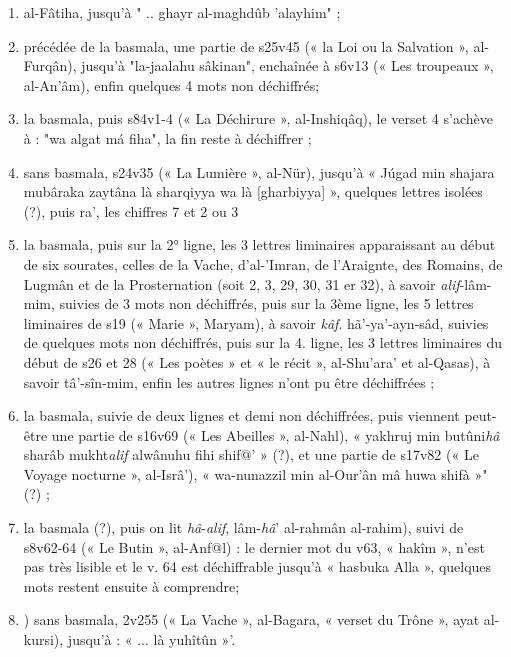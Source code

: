 \begin{enumerate}
   \item al-Fâtiha, jusqu'à
" .. ghayr al-maghdûb 'alayhim" ;
  \item précédée de la basmala,  une partie de s25v45 (« la Loi ou la
Salvation », al-Furqân), jusqu'à "la-jaalahu sâkinan", enchaînée à s6v13
(« Les troupeaux », al-An'âm), enfin quelques 4 mots non déchiffrés;
  \item la basmala, puis s84v1-4 (« La Déchirure », al-Inshiqâq), le verset
4 s'achève à : "wa algat má fiha", la fin reste à déchiffrer ;
  \item sans basmala, s24v35 (« La Lumière », al-Nür), jusqu'à « Júgad
min shajara mubâraka zaytâna là sharqiyya wa là [gharbiyya] », quelques lettres isolées (?), puis ra', les chiffres 7 et 2 ou 3
  \item la basmala, puis sur la 2° ligne, les 3 lettres liminaires apparaissant
au début de six sourates, celles de la Vache, d'al-'Imran, de l'Araignte, des Romains, de Lugmân et de la Prosternation (soit 2, 3, 29, 30, 31 er
32), à savoir \textit{alif}-lâm-mim, suivies de 3 mots non déchiffrés, puis sur la 3ème ligne, les 5 lettres liminaires de s19 (« Marie », Maryam), à savoir \textit{kâf}.
hã'-ya'-ayn-sâd, suivies de quelques mots non déchiffrés, puis sur la 4. ligne, les 3 lettres liminaires du début de s26 et   28 (« Les poètes » et « le
récit », al-Shu'ara' et al-Qasas), à savoir tâ'-sîn-mim, enfin les autres
lignes n'ont pu être déchiffrées ;
  \item la basmala, suivie de deux lignes et demi non déchiffrées, puis viennent peut-être une partie de s16v69 (« Les Abeilles », al-Nahl),
« yakhruj min butûni\textit{hâ} sharâb mukht\textit{alif} alwânuhu fihi shif@' » (?), et une partie de s17v82 (« Le Voyage nocturne », al-Isrâ'), « wa-nunazzil
min al-Our'ân mâ huwa shifà »" (?) ;
  \item la basmala (?), puis on lit \textit{hâ}-\textit{alif}, lâm-\textit{hâ}' al-rahmân al-rahim), suivi de s8v62-64 (« Le Butin », al-Anf@l) : le dernier mot du v63,
« hakîm », n'est pas très lisible et le v. 64 est déchiffrable jusqu'à « hasbuka Alla », quelques mots restent ensuite à comprendre;
  \item) sans basmala, 2v255 (« La Vache », al-Bagara, « verset du
Trône », ayat al-kursi), jusqu'à : « ... là yuhîtûn »'.
\end{enumerate}

